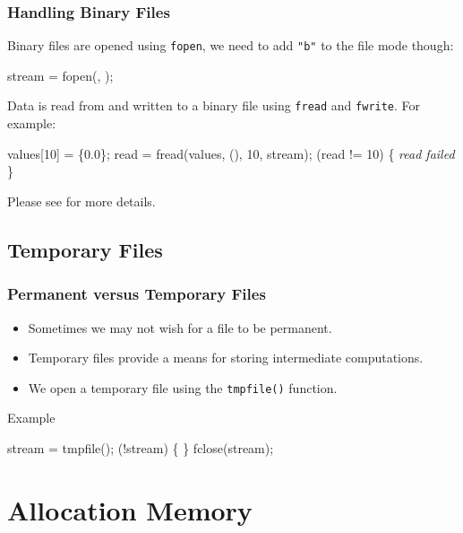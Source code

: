 \documentclass[smaller,table]{beamer}
\begin{document}
\begin{frame}[fragile]
\frametitle{Handling Binary Files}
Binary files are opened using {\tt fopen}, we need to add {\tt "b"} to the file mode though:
\begin{semiverbatim}
stream = fopen(, );
\end{semiverbatim}
Data is read from and written to a binary file using {\tt fread} and {\tt fwrite}. For example:
\begin{semiverbatim}
 values[10] = \{0.0\};
read = fread(values, (), 10, stream);
 (read != 10)
\{ \emph{read failed} \}
\end{semiverbatim}
\begin{block}{}
\begin{center}
Please see  for more details.
\end{center}
\end{block}
\end{frame}

\subsection{Temporary Files}
\begin{frame}[fragile]
\frametitle{Permanent versus Temporary Files}
\begin{itemize}
\item Sometimes we may not wish for a file to be permanent.
\item Temporary files provide a means for storing intermediate computations.
\item We open a temporary file using the {\tt tmpfile()} function.
\end{itemize}
\begin{block}{Example}
\begin{semiverbatim}
stream = tmpfile();
 (!stream)
\{
\}
fclose(stream);
\end{semiverbatim}
\end{block}
\end{frame}


\section{Allocation Memory}
\end{document}
